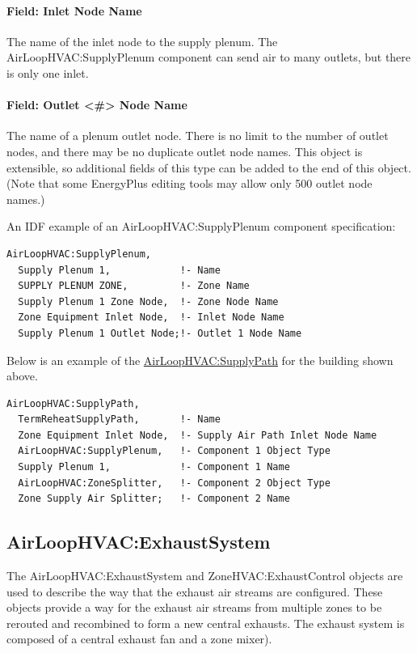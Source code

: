 \paragraph{Field: Inlet Node Name}\label{field-inlet-node-name-1}

The name of the inlet node to the supply plenum. The AirLoopHVAC:SupplyPlenum component can send air to many outlets, but there is only one inlet.

\paragraph{Field: Outlet \textless{}\#\textgreater{} Node Name}\label{field-outlet-node-name-1-000}

The name of a plenum outlet node. There is no limit to the number of outlet nodes, and there may be no duplicate outlet node names.  This object is extensible, so additional fields of this type can be added to the end of this object. (Note that some EnergyPlus editing tools may allow only 500 outlet node names.)

An IDF example of an AirLoopHVAC:SupplyPlenum component specification:

\begin{lstlisting}
AirLoopHVAC:SupplyPlenum,
  Supply Plenum 1,            !- Name
  SUPPLY PLENUM ZONE,         !- Zone Name
  Supply Plenum 1 Zone Node,  !- Zone Node Name
  Zone Equipment Inlet Node,  !- Inlet Node Name
  Supply Plenum 1 Outlet Node;!- Outlet 1 Node Name
\end{lstlisting}

Below is an example of the \hyperref[airloophvacsupplypath]{AirLoopHVAC:SupplyPath} for the building shown above.

\begin{lstlisting}
AirLoopHVAC:SupplyPath,
  TermReheatSupplyPath,       !- Name
  Zone Equipment Inlet Node,  !- Supply Air Path Inlet Node Name
  AirLoopHVAC:SupplyPlenum,   !- Component 1 Object Type
  Supply Plenum 1,            !- Component 1 Name
  AirLoopHVAC:ZoneSplitter,   !- Component 2 Object Type
  Zone Supply Air Splitter;   !- Component 2 Name
\end{lstlisting}

\subsection{AirLoopHVAC:ExhaustSystem}\label{airloophvacexhaustsystem}

The AirLoopHVAC:ExhaustSystem and ZoneHVAC:ExhaustControl objects are used to describe the way that the exhaust air streams are configured. These objects provide a way for the exhaust air streams from multiple zones to be rerouted and recombined to form a new central exhausts. The exhaust system is composed of a central exhaust fan and a zone mixer).

